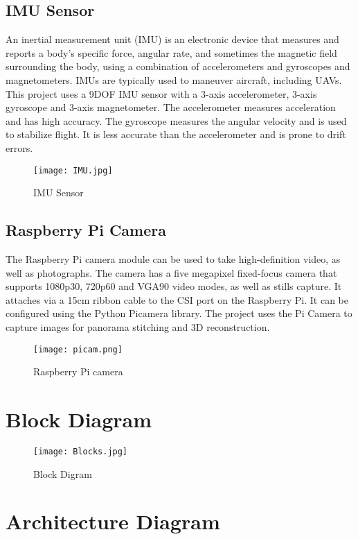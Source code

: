 \subsection{IMU Sensor}
An inertial measurement unit (IMU) is an electronic device that measures and reports a body's specific force, angular rate, and sometimes the magnetic field surrounding the body, using a combination of accelerometers and gyroscopes and magnetometers. IMUs are typically used to maneuver aircraft, including UAVs. This project uses a 9DOF IMU sensor with a 3-axis accelerometer, 3-axis gyroscope and 3-axis magnetometer. The accelerometer measures acceleration and has high accuracy. The gyroscope measures the angular velocity and is used to stabilize flight. It is less accurate than the accelerometer and is prone to drift errors. 
\begin{figure}[H]
  \centering
  \texttt{[image: IMU.jpg]}
  \caption{IMU Sensor}
  \label{IMU Sensor}	
\end{figure}

\subsection{Raspberry Pi Camera}
The Raspberry Pi camera module can be used to take high-definition video, as well as photographs. The camera has a five megapixel fixed-focus camera that supports 1080p30, 720p60 and VGA90 video modes, as well as stills capture. It attaches via a 15cm ribbon cable to the CSI port on the Raspberry Pi. It can be configured using the Python Picamera library. The project uses the Pi Camera to capture images for panorama stitching and 3D reconstruction.
\begin{figure}[H]
  \centering
  \texttt{[image: picam.png]}
  \caption{Raspberry Pi camera}
  \label{RPi camera}	
\end{figure}

\section{Block Diagram}

\begin{figure}[H]
  \centering
  \texttt{[image: Blocks.jpg]}
  \caption{Block Digram}
  \label{block}	
\end{figure}

\section{Architecture Diagram}

